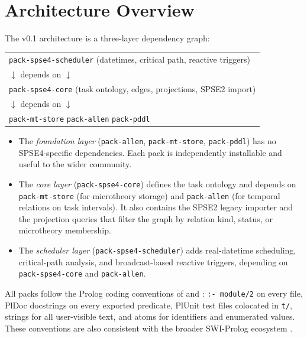 \documentclass[11pt,letterpaper]{article}
\begin{document}
\section{Architecture Overview}
\label{sec:arch}

The v0.1 architecture is a three-layer dependency graph:

\begin{center}
\begin{tabular}{@{}l@{}}
\texttt{pack-spse4-scheduler} \quad (datetimes, critical path, reactive triggers)\\
\quad $\downarrow$ depends on $\downarrow$\\
\texttt{pack-spse4-core} \quad (task ontology, edges, projections, SPSE2 import)\\
\quad $\downarrow$ depends on $\downarrow$\\
\texttt{pack-mt-store} \quad \texttt{pack-allen} \quad \texttt{pack-pddl}\\
\end{tabular}
\end{center}

\begin{itemize}
\item The \emph{foundation layer} (\texttt{pack-allen},
  \texttt{pack-mt-store}, \texttt{pack-pddl}) has no SPSE4-specific
  dependencies. Each pack is independently installable and useful to the
  wider community.
\item The \emph{core layer} (\texttt{pack-spse4-core}) defines the task
  ontology and depends on \texttt{pack-mt-store} (for microtheory storage)
  and \texttt{pack-allen} (for temporal relations on task intervals). It
  also contains the SPSE2 legacy importer and the projection queries that
  filter the graph by relation kind, status, or microtheory membership.
\item The \emph{scheduler layer} (\texttt{pack-spse4-scheduler}) adds
  real-datetime scheduling, critical-path analysis, and broadcast-based
  reactive triggers, depending on \texttt{pack-spse4-core} and
  \texttt{pack-allen}.
\end{itemize}

All packs follow the Prolog coding conventions of \citet{covington-style-2012}
and \citet{bratko-2011}: \texttt{:- module/2} on every file, PlDoc docstrings
on every exported predicate, PlUnit test files colocated in \texttt{t/},
strings for all user-visible text, and atoms for identifiers and enumerated
values. These conventions are also consistent with the broader SWI-Prolog
ecosystem \citep{wielemaker-swipl-2012}.
\end{document}
